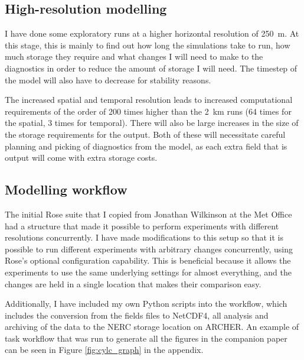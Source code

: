\documentclass[11pt,a4paper]{article}
\begin{document}
\subsection{High-resolution modelling}
\label{sec:high_res_modeling}
I have done some exploratory runs at a higher horizontal resolution of \SI{250}{m}. At this stage, this is mainly to find out how long the simulations take to run, how much storage they require and what changes I will need to make to the diagnostics in order to reduce the amount of storage I will need. The timestep of the model will also have to decrease for stability reasons. 

The increased spatial and temporal resolution leads to increased computational requirements of the order of 200 times higher than the \SI{2}{km} runs (64 times for the spatial, 3 times for temporal). There will also be large increases in the size of the storage requirements for the output. Both of these will necessitate careful planning and picking of diagnostics from the model, as each extra field that is output will come with extra storage costs. 





\subsection{Modelling workflow}
\label{sec:modelling_workflow}

The initial Rose suite that I copied from Jonathan Wilkinson at the Met Office had a structure that made it possible to perform experiments with different resolutions concurrently. I have made modifications to this setup so that it is possible to run different experiments with arbitrary changes concurrently, using Rose's optional configuration capability. This is beneficial because it allows the experiments to use the same underlying settings for almost everything, and the changes are held in a single location that makes their comparison easy.

Additionally, I have included my own Python scripts into the workflow, which includes the conversion from the fields files to NetCDF4, all analysis and archiving of the data to the NERC storage location on ARCHER. An example of task workflow that was run to generate all the figures in the companion paper can be seen in Figure \ref{fig:cylc_graph} in the appendix.
\end{document}
